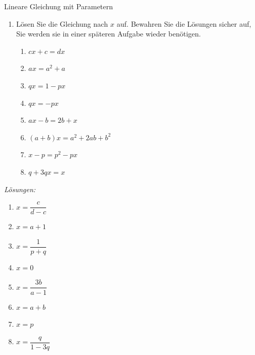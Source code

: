 \begin{ueb}
    {Lineare Gleichung mit Parametern}{}
    \begin{enumerate}
        \item Lösen Sie die Gleichung nach \(x\) auf. Bewahren Sie die Lösungen sicher auf, Sie werden sie in einer späteren Aufgabe wieder benötigen.

              \begin{enumerate}
                  \item \(cx+c=dx\)
                  \item \(ax=a^2+a\)
                  \item \(qx=1-px\)
                  \item \(qx=-px\)
                  \item \(ax-b=2b+x\)
                  \item \((a+b)x=a^2+2ab+b^2\)
                  \item \(x-p=p^2-px\)
                  \item \(q+3qx=x\)
              \end{enumerate}
    \end{enumerate}
\end{ueb}
\clearpage
\emph{Lösungen:}
\begin{enumerate}
    \item \(x=\dfrac{c}{d-c}\)
    \item \(x=a+1\)
    \item \(x=\dfrac{1}{p+q}\)
    \item \(x=0\)
    \item \(x=\dfrac{3b}{a-1}\)
    \item \(x=a+b\)
    \item \(x=p\)
    \item \(x=\dfrac{q}{1-3q}\)
\end{enumerate}









